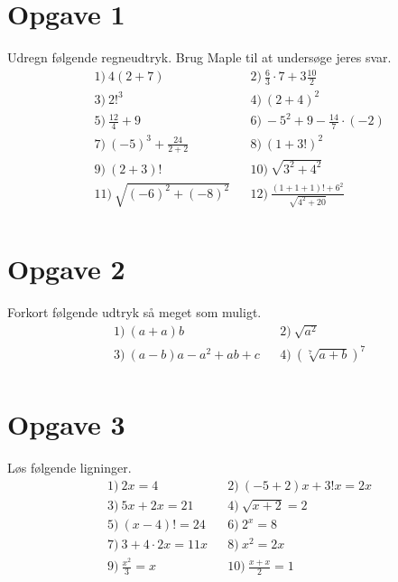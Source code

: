 \section*{Opgave 1}
Udregn følgende regneudtryk. Brug Maple til at undersøge jeres svar. 
\begin{align*}
	&1) \ 4(2+7)   &&2) \   \frac{6}{3}\cdot 7+3\frac{10}{2}  \\
	&3) \ 2!^3   &&4) \  (2+4)^2   \\
	&5) \  \frac{12}{4} +9 &&6) \  -5^2+9-\frac{14}{7}\cdot(-2)   \\
	&7) \ (-5)^3+\frac{24}{2+2}    &&8) \  (1+3!)^2   \\
	&9) \  (2+3)!  &&10) \  \sqrt{3^2+4^2}   \\
	&11) \ \sqrt{(-6)^2+(-8)^2}   &&12) \  \frac{(1+1+1)!+6^2}{\sqrt{4^2+20}}   \\
\end{align*}

\section*{Opgave 2}
Forkort følgende udtryk så meget som muligt.
\begin{align*}
	&1) \  (a+a)b  &&2) \  \sqrt{a^2}   \\
	&3) \  (a-b)a-a^2+ab+c  &&4) \ (\sqrt[7]{a+b})^7    \\
\end{align*}


\section*{Opgave 3}
Løs følgende ligninger.	
\begin{align*}
	&1) \  2x = 4  &&2) \ (-5+2)x+3!x = 2x   \\
	&3) \  5x+2x = 21  &&4) \ \sqrt{x+2} = 2   \\
	&5) \  (x-4)! = 24  &&6) \  2^x = 8  \\
	&7) \  3+4\cdot 2x = 11x  &&8) \ x^2 = 2x   \\
	&9) \  \frac{x^2}{3} = x  &&10) \  \frac{x+x}{2} = 1  \\	
\end{align*}